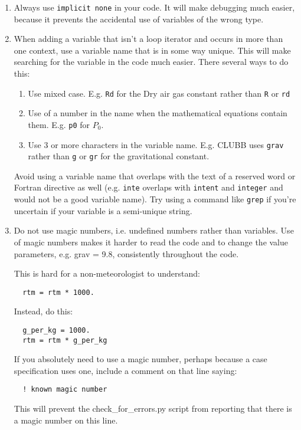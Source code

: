 \documentclass[letterpaper,12pt]{article}
\begin{document}
\begin{enumerate}
\item Always use \texttt{implicit none} in your code.  It will make 
debugging much easier, because it prevents the accidental use of 
variables of the wrong type.
\newline

\item When adding a variable that isn't a loop iterator and occurs in more 
than one context, use a variable name that is in some way unique. 
This will make searching for the variable in the code much easier. 
There several ways to do this:
	\begin{enumerate}
	\item Use mixed case.  E.g. \texttt{Rd} for the Dry air gas constant 
	rather than \texttt{R} or \texttt{rd}
	\item Use of a number in the name when the mathematical equations 
	contain them. 
	 E.g. \texttt{p0} for $P_0$.
	\item Use 3 or more characters in the variable name.
	E.g. CLUBB uses \texttt{grav} 
	rather than \texttt{g} or \texttt{gr} for the gravitational constant.
	\end{enumerate}
Avoid using a variable name that overlaps with the text of a reserved word or
Fortran directive as well (e.g. \texttt{inte} overlaps with \texttt{intent} 
and \texttt{integer} and would not be a good variable name).
Try using a command
like \texttt{grep} if you're uncertain if your variable is a semi-unique string.
\newline

\item  Do not use magic numbers, i.e. undefined numbers rather than variables.
Use of magic numbers makes it harder to read the code and to change the value 
parameters, e.g. grav = 9.8, consistently throughout the code.

This is hard for a non-meteorologist to understand: 
\begin{verbatim}
  rtm = rtm * 1000. 
\end{verbatim}

Instead, do this:
\begin{verbatim}
  g_per_kg = 1000.
  rtm = rtm * g_per_kg
\end{verbatim}

If you absolutely need to use a magic number, perhaps because a case 
specification uses one, include a comment on that line saying:
\begin{verbatim}
  ! known magic number
\end{verbatim}
This will prevent the check\_for\_errors.py script from reporting that there is a 
magic number on this line.


\end{enumerate}
\end{document}
